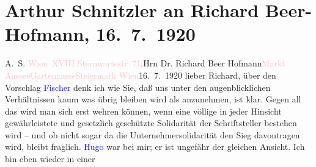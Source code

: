 

               \section[Arthur Schnitzler an Richard Beer-Hofmann, 16. 7. 1920]{ Arthur Schnitzler an Richard Beer-Hofmann, 16. 7. 1920}\nopagebreak{}\rehead{ }\normalsize\beginnumbering{} \toendnotes[C]{\smallbreak\pagebreak[2]} 
\toendnotes[C]{\smallbreak}\pstart{}{\pb}A. S. \textcolor{pink}{Wien XVIII
                     Sternwartestr 71}{}\ledrightnote{\textcolor{pink}{Sternwartestraße}}.\pend{}{\bigskip}\pstart{}{\pb}Hrn Dr. Richard Beer Hofmann\pend{}\pstart{}\textcolor{pink}{Markt Aussee}{}\ledrightnote{\textcolor{pink}{Bad Aussee}}\pend{}\pstart{}\textcolor{pink}{Gartengasse}{}\ledrightnote{\textcolor{pink}{Gartengasse}}\pend{}\pstart{}\textcolor{pink}{Steiermark}{}\ledrightnote{\textcolor{pink}{Steiermark}}\pend{}{\bigskip}\pstart
           \raggedleft{}{\pb}\textcolor{pink}{Wien}{}\ledrightnote{\textcolor{pink}{Wien}}{ }16. 7. 1920\pend
           \pstart{}lieber Richard,\pend\pstart
           über den Vorschlag \textcolor{blue}{Fischer}{}\ledrightnote{\textcolor{blue}{Samuel Fischer}} denk ich wie Sie, daß
               uns unter den augenblicklichen Verhältnissen kaum was übrig bleiben wird als
               anzunehmen, ist klar. Gegen all das wird man sich erst wehren können, wenn eine
               völlige in jeder Hinsicht gewährleistete und gesetzlich geschützte Solidarität der
               Schriftsteller bestehen wird – und ob nicht sogar da{\geminationn}
               die Unternehmersolidarität den Sieg davontragen wird, bleibt fraglich. \textcolor{blue}{Hugo}{}\ledrightnote{\textcolor{blue}{Hugo von Hofmannsthal}} war \label{KLL02350_Beer-Hofmann-1v}\label{KLL02350_Beer-Hofmann-1h} bei mir; er ist ungefähr der gleichen Ansicht. Ich bin eben wieder in einer

